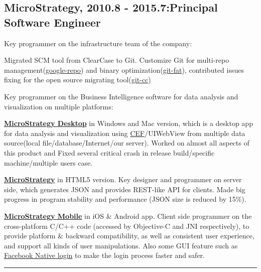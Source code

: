\documentclass[letterpaper]{article}
\renewenvironment{itemize}{
\begin{list}{*}{
    \setlength{\leftmargin}{1.5em}
    \setlength{\itemsep}{0pt}
  }
}{
  \end{list}
}
\begin{document}
\subsection*{\textbf{MicroStrategy, 2010.8 - 2015.7:\hfill Principal Software Engineer}}
Key programmer on the infrastructure team of the company:
\begin{itemize}
\item Migrated SCM tool from ClearCase to Git. Customize Git for multi-repo management(\href{https://source.android.com/source/using-repo.html}{google-repo}) and binary optimization(\href{https://github.com/cyaninc/git-fat}{git-fat}), contributed issues fixing for the open source migrating tool(\href{https://github.com/charleso/git-cc/issues/57}{git-cc}) 
\end{itemize}
Key programmer on the Business Intelligence software for data analysis and visualization on multiple platforms:
\begin{itemize}
\item \href{http://www.microstrategy.com/us/analytics/desktop}{\textbf{MicroStrategy Desktop}} in Windows and Mac version, which is a desktop app for data analysis and visualization using \href{https://bitbucket.org/chromiumembedded/cef}{CEF}/UIWebView from multiple data source(local file/database/Internet/our server). Worked on almost all aspects of this product and Fixed several critical crash in release build/specific machine/multiple users case.
\item \href{http://www.microstrategy.com/us/analytics}{\textbf{MicroStrategy}} in HTML5 version. Key designer and programmer on server side, which generates JSON and provides REST-like API for clients. Made big progress in program stability and performance (JSON size is reduced by 15\%).
\item \href{http://www.microstrategy.com/us/mobile}{\textbf{MicroStrategy Mobile}} in iOS \& Android app. Client side programmer on the cross-platform C/C++ code (accessed by Objective-C and JNI respectively), to provide platform \& backward compatibility, as well as consistent user experience, and support all kinds of user manipulations. Also some GUI feature such as \href{https://developers.facebook.com/docs/facebook-login/ios/}{Facebook Native login} to make the login process faster and safer.
\end{itemize}

\rule{16.8cm}{0.1em}

\vspace{-1em}
\end{document}
